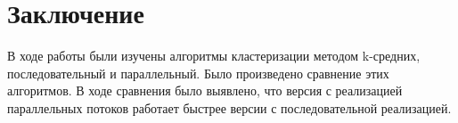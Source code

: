\chapter*{Заключение}

В ходе работы были изучены алгоритмы кластеризации методом k-средних, последовательный и параллельный. Было произведено сравнение этих алгоритмов. В ходе сравнения было выявлено, что версия с реализацией параллельных потоков работает быстрее версии с последовательной реализацией.
